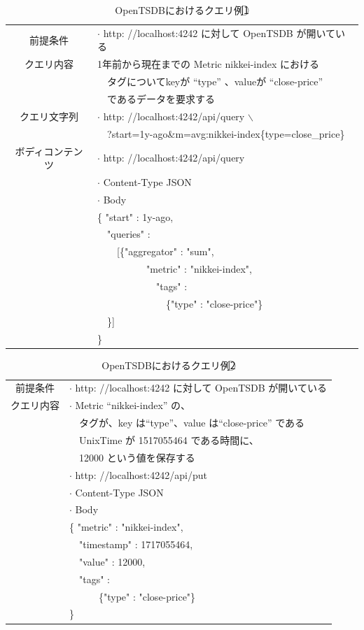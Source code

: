 \documentclass{scrartcl}
\begin{document}
\begin{table}[htbp]
\caption{OpenTSDBにおけるクエリ例\textcircled{\scriptsize 1}}
\centering
\begin{tabular}{|c|l|}
\hline
前提条件 & \(\cdot\) http: //localhost:4242 に対して OpenTSDB が開いている\\
クエリ内容 & 1年前から現在までの Metric nikkei-index における\\
 & 　タグについてkeyが ``type'' 、valueが ``close-price''\\
 & 　であるデータを要求する\\
\hline
クエリ文字列 & \(\cdot\) http: //localhost:4242/api/query $\backslash$\\
 & 　?start=1y-ago\&m=avg:nikkei-index\{type=close\_price\}\\
\hline
ボディコンテンツ & \(\cdot\) http: //localhost:4242/api/query\\
 & \(\cdot\) Content-Type JSON\\
 & \(\cdot\) Body\\
 & \{ "start" : 1y-ago,\\
 & 　"queries" :\\
 & 　　[\{"aggregator" : "sum",\\
 & 　　　　　"metric" : "nikkei-index",\\
 & 　　　　　　"tags" :\\
 & 　　　　　　　\{"type" : "close-price"\}\\
 & 　\}]\\
 & \}\\
\hline
\end{tabular}
\end{table}

\begin{table}[htbp]
\caption{OpenTSDBにおけるクエリ例\textcircled{\scriptsize 2}}
\centering
\begin{tabular}{|c|l|}
\hline
前提条件 & \(\cdot\) http: //localhost:4242 に対して OpenTSDB が開いている\\
クエリ内容 & \(\cdot\) Metric ``nikkei-index'' の、\\
 & 　タグが、key は``type''、value は``close-price'' である\\
 & 　UnixTime が 1517055464 である時間に、\\
 & 　12000 という値を保存する\\
\hline
 & \(\cdot\) http: //localhost:4242/api/put\\
 & \(\cdot\) Content-Type JSON\\
 & \(\cdot\) Body\\
 & \{ "metric" : "nikkei-index",\\
 & 　"timestamp" : 1717055464,\\
 & 　"value" : 12000,\\
 & 　"tags" :\\
 & 　　　\{"type" : "close-price"\}\\
 & \}\\
\hline
\end{tabular}
\end{table}
\end{document}
